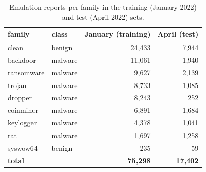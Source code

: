 \begin{table}[t]
\centering
\small
\caption{Emulation reports per family in the training (January 2022) and test (April 2022) sets.}
\label{tab:T1_dataset}
\begin{tabular}{llrr}
\toprule
family & class & January (training) & April (test) \\
\midrule
clean & benign & 24,433 & 7,944 \\
backdoor & malware & 11,061 & 1,940 \\
ransomware & malware & 9,627 & 2,139 \\
trojan & malware & 8,733 & 1,085 \\
dropper & malware & 8,243 & 252 \\
coinminer & malware & 6,891 & 1,684 \\
keylogger & malware & 4,378 & 1,041 \\
rat & malware & 1,697 & 1,258 \\
syswow64 & benign & 235 & 59 \\
\textbf{total} &  & \textbf{75,298} & \textbf{17,402} \\
\bottomrule
\end{tabular}
\end{table}
